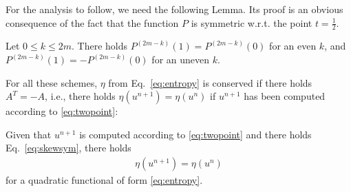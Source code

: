 \documentclass[]{scrartcl}
\numberwithin{equation}{section}
\begin{document}
For the analysis to follow, we need the following Lemma. Its proof is an obvious consequence of the fact that the function $P$ is symmetric w.r.t. the point $t = \frac 1 2$.
\begin{lemma}\label{la:symmetry}
  Let $0 \leq k \leq 2m$.
  There holds $P^{(2m-k)}(1) = P^{(2m-k)}(0)$ for an even $k$, and $P^{(2m-k)}(1) = -P^{(2m-k)}(0)$ for an uneven $k$.
\end{lemma}
%
For all these schemes, $\eta$ from Eq.~\eqref{eq:entropy} is conserved if there holds $A^T=-A$, i.e., there holds $\eta(u^{n+1}) = \eta(u^n)$ if $u^{n+1}$ has been computed according to \eqref{eq:twopoint}:
\begin{theorem}
 Given that $u^{n+1}$ is computed according to \eqref{eq:twopoint} and there holds Eq.~\eqref{eq:skewsym}, there holds
 \begin{align}
  \eta(u^{n+1}) = \eta(u^n)
 \end{align}
 for a quadratic functional of form \eqref{eq:entropy}.
\end{theorem}
\end{document}
